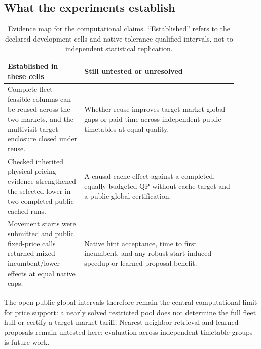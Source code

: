 \subsection{What the experiments establish}

\begin{table}[t]
\centering\small
\caption{Evidence map for the computational claims.  ``Established'' refers to the declared development cells and native-tolerance-qualified intervals, not to independent statistical replication.}\label{tab:computational-evidence-map}
\begin{tabular}{>{\raggedright\arraybackslash}p{0.30\linewidth}>{\raggedright\arraybackslash}p{0.60\linewidth}}
\toprule
Established in these cells & Still untested or unresolved \\
\midrule
Complete-fleet feasible columns can be reused across the two markets, and the multivisit target enclosure closed under reuse. & Whether reuse improves target-market global gaps or paid time across independent public timetables at equal quality. \\
Checked inherited physical-pricing evidence strengthened the selected lower in two completed public cached runs. & A causal cache effect against a completed, equally budgeted QP-without-cache target and a public global certification. \\
Movement starts were submitted and public fixed-price calls returned mixed incumbent/lower effects at equal native caps. & Native hint acceptance, time to first incumbent, and any robust start-induced speedup or learned-proposal benefit. \\
\bottomrule
\end{tabular}
\end{table}

The open public global intervals therefore remain the central computational limit for price support: a nearly solved restricted pool does not determine the full fleet hull or certify a target-market tariff.  Nearest-neighbor retrieval and learned proposals remain untested here; evaluation across independent timetable groups is future work.
